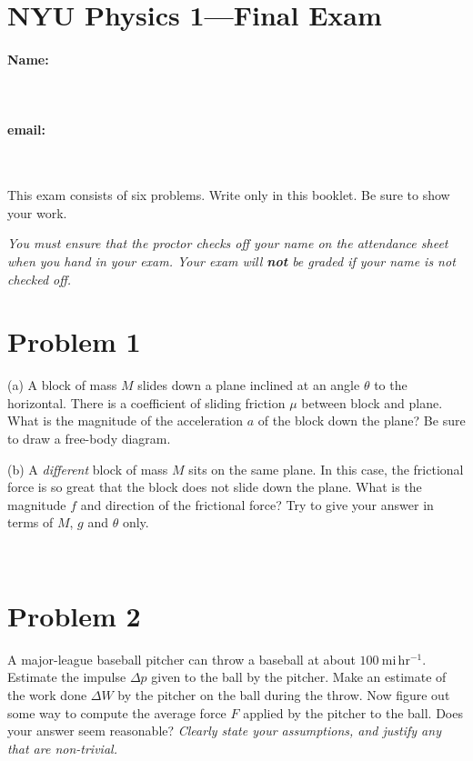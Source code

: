 \documentclass[12pt]{article}
\begin{document}
\section*{NYU Physics 1---Final Exam}

\vfill

\paragraph{Name:} ~

\paragraph{email:} ~

\vfill

This exam consists of six problems.  Write only in this booklet.  Be
sure to show your work.

\vfill

\emph{You must ensure that the proctor checks off your name on the
attendance sheet when you hand in your exam.  Your exam will
\textbf{not} be graded if your name is not checked off.}

\clearpage

\section*{Problem 1}

(a) A block of mass $M$ slides down a plane inclined at an angle
$\theta$ to the horizontal.  There is a coefficient of sliding
friction $\mu$ between block and plane.  What is the magnitude of the
acceleration $a$ of the block down the plane?  Be sure to draw a
free-body diagram.

\vfill

(b) A \emph{different} block of mass $M$ sits on the same plane.  In
this case, the frictional force is so great that the block does not
slide down the plane.  What is the magnitude $f$ and direction of the
frictional force?  Try to give your answer in terms of $M$, $g$ and
$\theta$ only.

\vfill ~

\clearpage

\section*{Problem 2}

A major-league baseball pitcher can throw a baseball at about
$100~\mathrm{mi\,hr^{-1}}$.  Estimate the impulse $\Delta p$ given to
the ball by the pitcher.  Make an estimate of the work done $\Delta W$
by the pitcher on the ball during the throw.  Now figure out some way
to compute the average force $F$ applied by the pitcher to the ball.
Does your answer seem reasonable?  \emph{Clearly state your
assumptions, and justify any that are non-trivial.}
\end{document}

